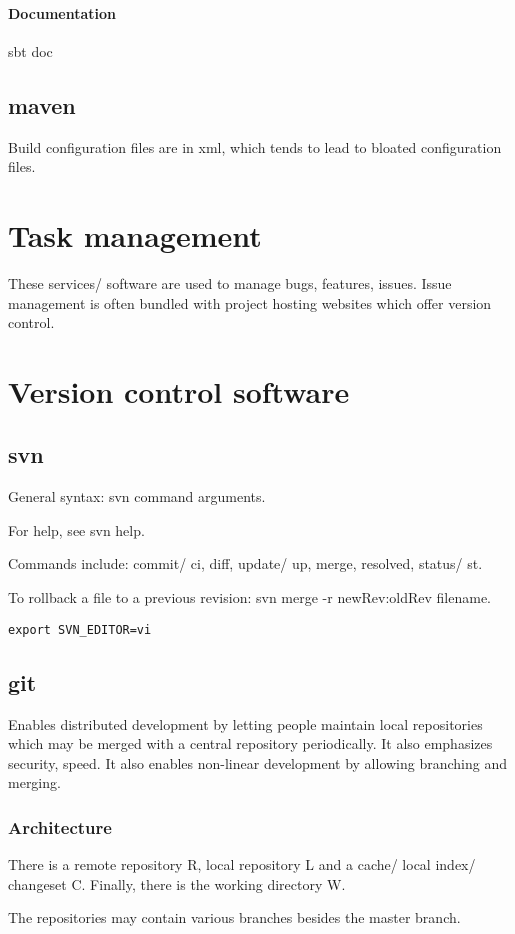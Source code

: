 \documentclass[oneside, article]{memoir}
\begin{document}
\subsubsection{Documentation}
sbt doc

\section{maven}
Build configuration files are in xml, which tends to lead to bloated configuration files.

\chapter{Task management}
These services/ software are used to manage bugs, features, issues. Issue management is often bundled with project hosting websites which offer version control.

\chapter{Version control software}
\section{svn}
General syntax: svn command arguments.

For help, see svn help.

Commands include: commit/ ci, diff, update/ up, merge, resolved, status/ st.

To rollback a file to a previous revision: svn merge -r newRev:oldRev filename.

\verb'export SVN_EDITOR=vi'

\section{git}
Enables distributed development by letting people maintain local repositories which may be merged with a central repository periodically. It also emphasizes security, speed. It also enables non-linear development by allowing branching and merging.

\subsection{Architecture}
There is a remote repository R, local repository L and a cache/ local index/ changeset C. Finally, there is the working directory W.

The repositories may contain various branches besides the master branch.
\end{document}
